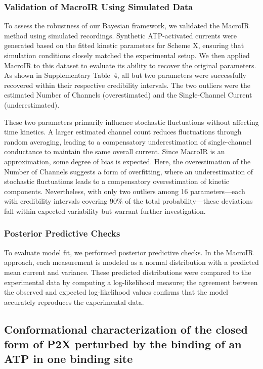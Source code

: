 \documentclass[9pt]{elife}
\begin{document}
	\subsubsection{Validation of MacroIR Using Simulated Data}  
	To assess the robustness of our Bayesian framework, we validated the MacroIR method using simulated recordings. Synthetic ATP-activated currents were generated based on the fitted kinetic parameters for Scheme X, ensuring that simulation conditions closely matched the experimental setup. We then applied MacroIR to this dataset to evaluate its ability to recover the original parameters. As shown in Supplementary Table~4, all but two parameters were successfully recovered within their respective credibility intervals. The two outliers were the estimated Number of Channels (overestimated) and the Single-Channel Current (underestimated).  
	
	These two parameters primarily influence stochastic fluctuations without affecting time kinetics. A larger estimated channel count reduces fluctuations through random averaging, leading to a compensatory underestimation of single-channel conductance to maintain the same overall current. Since MacroIR is an approximation, some degree of bias is expected. Here, the overestimation of the Number of Channels suggests a form of overfitting, where an underestimation of stochastic fluctuations leads to a compensatory overestimation of kinetic components. Nevertheless, with only two outliers among 16 parameters—each with credibility intervals covering 90\% of the total probability—these deviations fall within expected variability but warrant further investigation.
	\subsubsection{Posterior Predictive Checks}  
	To evaluate model fit, we performed posterior predictive checks. In the MacroIR approach, each measurement is modeled as a normal distribution with a predicted mean current and variance. These predicted distributions were compared to the experimental data by computing a log-likelihood measure; the agreement between the observed and expected log-likelihood values confirms that the model accurately reproduces the experimental data.
	
	\subsection{Conformational characterization of the closed form of P2X perturbed by the binding of an ATP in one binding site}
	
\end{document}
